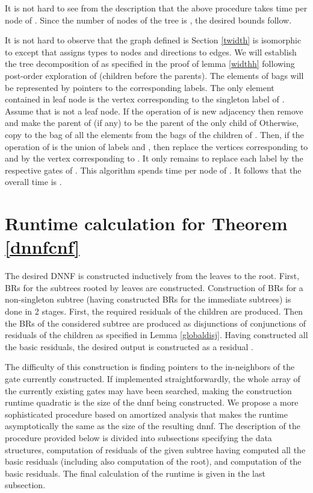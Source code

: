 \documentclass{llncs}
\begin{document}
It is not hard to see from the description that the above procedure takes  time per node of .
Since the number of nodes of the tree is , the desired bounds follow. 

It is not hard to observe that the graph  defined is Section \ref{twidth} is isomorphic to  except that  assigns types to
nodes and directions to edges. We will establish the tree decomposition of  as specified in the proof of lemma \ref{widthh} following
post-order exploration of  (children before the parents). The elements of bags will be represented by pointers to the corresponding labels.
The only element contained in leaf node  is the vertex corresponding to the singleton label of . Assume that  is not a leaf node.
If the operation of  is new adjacency then remove  and make the parent of  (if any) to be the parent of the only child of 
Otherwise, copy to the bag of  all the elements from the bags of the children of . Then, if the operation of  is the union of labels 
and , then replace the vertices corresponding to  and  by the vertex corresponding to . 
It only remains to replace each label by the respective gates of . This algorithm spends  time per node of . It follows 
that the overall time is . 

\section{Runtime calculation for Theorem \ref{dnnfcnf}}
The desired DNNF is constructed inductively from the leaves
to the root. First, BRs for the subtrees rooted by leaves are constructed.
Construction of BRs for a non-singleton subtree (having constructed BRs
for the immediate subtrees) is done in 2 stages. First, the required
residuals of the children are produced. Then the BRs of the considered subtree
are produced as disjunctions of conjunctions of residuals of the children as
specified in Lemma \ref{globaldisj}. Having constructed all the basic residuals,
the desired output  is constructed as a residual . 


The difficulty of this construction is
finding pointers to the in-neighbors of the gate currently constructed. 
If implemented straightforwardly, the whole array of the currently existing
gates may have been searched, making the construction runtime quadratic
is the size of the {\sc dnnf} being constructed. We propose a more sophisticated
procedure based on amortized analysis that makes the runtime asymptotically
the same as the size of the resulting {\sc dnnf}. The description of the procedure
provided below is divided into  subsections specifying the data structures,
computation of residuals of the given subtree having computed all the basic residuals
(including also computation of the root), and computation of the basic residuals. 
The final calculation of the runtime is given in the last subsection.
\end{document}
